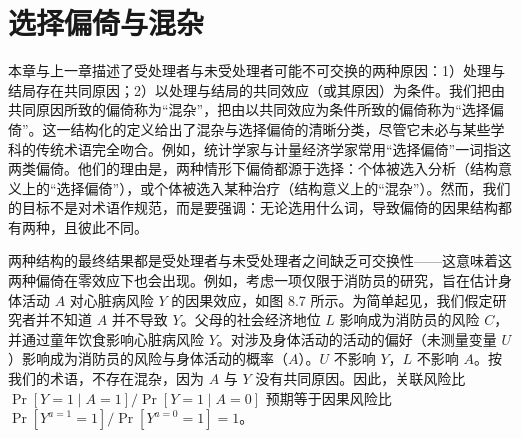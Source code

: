 \section{选择偏倚与混杂}

本章与上一章描述了受处理者与未受处理者可能不可交换的两种原因：1）处理与结局存在共同原因；2）以处理与结局的共同效应（或其原因）为条件。我们把由共同原因所致的偏倚称为“混杂”，把由以共同效应为条件所致的偏倚称为“选择偏倚”。这一结构化的定义给出了混杂与选择偏倚的清晰分类，尽管它未必与某些学科的传统术语完全吻合。例如，统计学家与计量经济学家常用“选择偏倚”一词指这两类偏倚。他们的理由是，两种情形下偏倚都源于选择：个体被选入分析（结构意义上的“选择偏倚”），或个体被选入某种治疗（结构意义上的“混杂”）。然而，我们的目标不是对术语作规范，而是要强调：无论选用什么词，导致偏倚的因果结构都有两种，且彼此不同。

两种结构的最终结果都是受处理者与未受处理者之间缺乏可交换性——这意味着这两种偏倚在零效应下也会出现。例如，考虑一项仅限于消防员的研究，旨在估计身体活动 $A$ 对心脏病风险 $Y$ 的因果效应，如图 8.7 所示。为简单起见，我们假定研究者并不知道 $A$ 并不导致 $Y$。父母的社会经济地位 $L$ 影响成为消防员的风险 $C$，并通过童年饮食影响心脏病风险 $Y$。对涉及身体活动的活动的偏好（未测量变量 $U$）影响成为消防员的风险与身体活动的概率（$A$）。$U$ 不影响 $Y$，$L$ 不影响 $A$。按我们的术语，不存在混杂，因为 $A$ 与 $Y$ 没有共同原因。因此，关联风险比 $\Pr[Y=1\mid A=1]/\Pr[Y=1\mid A=0]$ 预期等于因果风险比 $\Pr[Y^{a=1}=1]/\Pr[Y^{a=0}=1]=1$。

\begin{figure}[htbp]
\centering
{}
\caption{}
\label{fig:8.7}
\end{figure}

